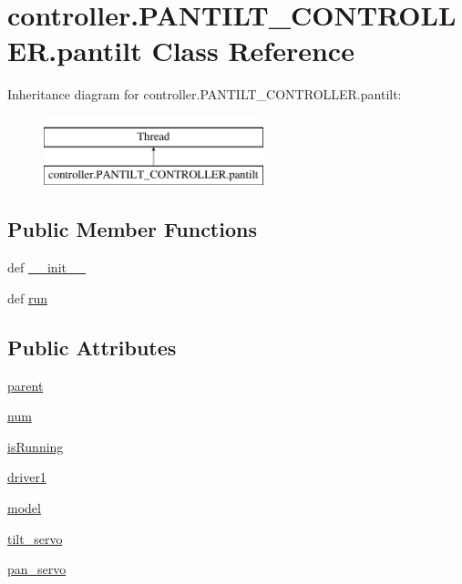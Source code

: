 \hypertarget{classcontroller_1_1PANTILT__CONTROLLER_1_1pantilt}{}\section{controller.\+P\+A\+N\+T\+I\+L\+T\+\_\+\+C\+O\+N\+T\+R\+O\+L\+L\+E\+R.\+pantilt Class Reference}
\label{classcontroller_1_1PANTILT__CONTROLLER_1_1pantilt}
Inheritance diagram for controller.\+P\+A\+N\+T\+I\+L\+T\+\_\+\+C\+O\+N\+T\+R\+O\+L\+L\+E\+R.\+pantilt\+:\begin{figure}[H]
\begin{center}
\leavevmode
\includegraphics[height=2.000000cm]{classcontroller_1_1PANTILT__CONTROLLER_1_1pantilt}
\end{center}
\end{figure}
\subsection*{Public Member Functions}
\begin{DoxyCompactItemize}
\item 
def \hyperlink{classcontroller_1_1PANTILT__CONTROLLER_1_1pantilt_a7de0de26f776775e5f1f4f165eabad5a}{\+\_\+\+\_\+init\+\_\+\+\_\+}
\item 
def \hyperlink{classcontroller_1_1PANTILT__CONTROLLER_1_1pantilt_abdd9e553f5882fb024a18a02a23bdf85}{run}
\end{DoxyCompactItemize}
\subsection*{Public Attributes}
\begin{DoxyCompactItemize}
\item 
\hyperlink{classcontroller_1_1PANTILT__CONTROLLER_1_1pantilt_afc2fa0a554c0d3ec465bf09d832fcf54}{parent}
\item 
\hyperlink{classcontroller_1_1PANTILT__CONTROLLER_1_1pantilt_a15cf83499c83b96b5eee02601919438f}{num}
\item 
\hyperlink{classcontroller_1_1PANTILT__CONTROLLER_1_1pantilt_a0e92951db4608e830b4b37616aa41096}{is\+Running}
\item 
\hyperlink{classcontroller_1_1PANTILT__CONTROLLER_1_1pantilt_af5635593bc5a63d45be083aa5e165a65}{driver1}
\item 
\hyperlink{classcontroller_1_1PANTILT__CONTROLLER_1_1pantilt_addf843595361a7270e1917354c8d41f2}{model}
\item 
\hyperlink{classcontroller_1_1PANTILT__CONTROLLER_1_1pantilt_a4b09a9cbf7fac18361ae3e9a772c7585}{tilt\+\_\+servo}
\item 
\hyperlink{classcontroller_1_1PANTILT__CONTROLLER_1_1pantilt_a384533b87bffe38df020ed6bfc992817}{pan\+\_\+servo}
\end{DoxyCompactItemize}


